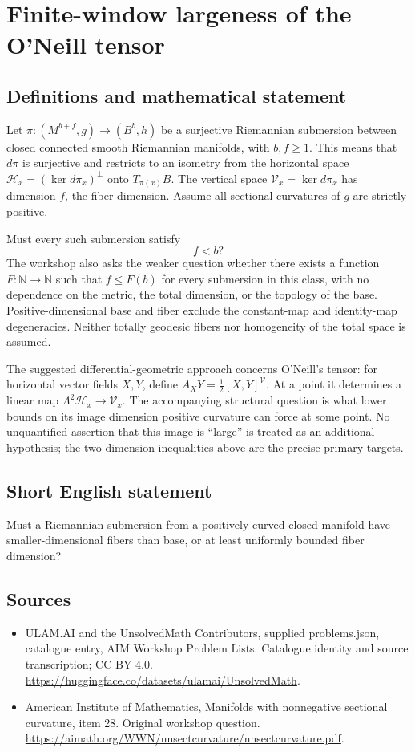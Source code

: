 \documentclass[11pt,a4paper]{article}
\begin{document}
\section*{Finite-window largeness of the O'Neill tensor}\label{statement}

\subsection{Definitions and mathematical statement}
Let $\pi:(M^{b+f},g)\to(B^b,h)$ be a surjective Riemannian submersion between closed connected smooth Riemannian manifolds, with $b,f\geq1$.
This means that $d\pi$ is surjective and restricts to an isometry from the horizontal space
$\mathcal H_x=(\ker d\pi_x)^\perp$ onto $T_{\pi(x)}B$.
The vertical space $\mathcal V_x=\ker d\pi_x$ has dimension $f$, the fiber dimension.
Assume all sectional curvatures of $g$ are strictly positive.

Must every such submersion satisfy
\[
 f<b?
\]
The workshop also asks the weaker question whether there exists a function $F:\mathbb N\to\mathbb N$ such that $f\leq F(b)$ for every submersion in this class, with no dependence on the metric, the total dimension, or the topology of the base.
Positive-dimensional base and fiber exclude the constant-map and identity-map degeneracies.
Neither totally geodesic fibers nor homogeneity of the total space is assumed.

The suggested differential-geometric approach concerns O'Neill's tensor:
for horizontal vector fields $X,Y$, define $A_XY=\tfrac12[X,Y]^{\mathcal V}$.
At a point it determines a linear map
$\Lambda^2\mathcal H_x\to\mathcal V_x$.
The accompanying structural question is what lower bounds on its image dimension positive curvature can force at some point.
No unquantified assertion that this image is ``large'' is treated as an additional hypothesis; the two dimension inequalities above are the precise primary targets.
\subsection{Short English statement}
Must a Riemannian submersion from a positively curved closed manifold have smaller-dimensional fibers than base, or at least uniformly bounded fiber dimension?
\subsection{Sources}
\begin{itemize}
\item[S1] ULAM.AI and the UnsolvedMath Contributors, supplied problems.json, catalogue entry, AIM Workshop Problem Lists. Catalogue identity and source transcription; CC BY 4.0.
\url{https://huggingface.co/datasets/ulamai/UnsolvedMath}.
\item[S2] American Institute of Mathematics, Manifolds with nonnegative sectional curvature, item 28. Original workshop question.
\url{https://aimath.org/WWN/nnsectcurvature/nnsectcurvature.pdf}.
\end{itemize}
\end{document}
